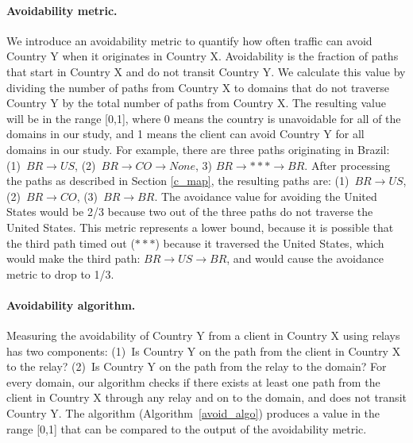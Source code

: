 \paragraph{Avoidability metric.}  We introduce an avoidability metric to
quantify how often
traffic can avoid Country Y when it originates in Country X.
Avoidability is the fraction of paths that start in Country
X and do not transit Country Y.  We calculate this value by dividing the
number of paths from Country X to domains that do not traverse Country Y
by the total number of paths from Country X. The resulting value will be
in the range [0,1], where 0 means the country is unavoidable for all of
the domains in our study, and 1 means the client can avoid Country Y for
all domains in our study.  For example, there are three paths
originating in Brazil: (1)~$BR \rightarrow US$, (2)~$BR \rightarrow CO
\rightarrow None$, 3) $BR \rightarrow *** \rightarrow BR$.  After
processing the paths as described in Section \ref{c_map}, the resulting
paths are: (1)~$BR \rightarrow US$, (2)~$BR \rightarrow CO$, (3)~$BR
\rightarrow BR$.  The avoidance value for avoiding the United States
would be 2/3 because two out of the three paths do not traverse the
United States.  This metric represents a lower bound,
because it is possible that the third path timed out ($***$) because it
traversed the United States, which would make the third path: $BR
\rightarrow US \rightarrow BR$, and would cause the avoidance metric to
drop to 1/3.


\paragraph{Avoidability algorithm.}  Measuring the avoidability of Country Y from a client in Country X using relays has two components: (1)~Is Country Y on the path from the client in Country X to the relay?  (2)~Is Country Y on the path from the relay to the domain?  For every domain, our algorithm checks if there exists at least one path from the client in Country X through any relay and on to the domain, and does not transit Country Y.  
The algorithm (Algorithm~\ref{avoid_algo}) produces a value in the range
[0,1] that can be compared to the output of the avoidability metric.

